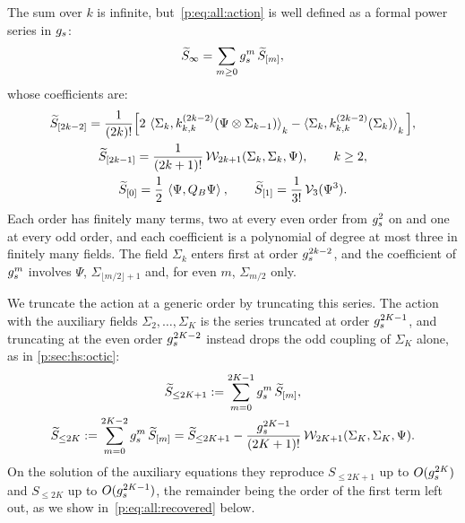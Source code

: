 The sum over $k$ is infinite, but~\eqref{p:eq:all:action} is well defined as a formal power series in $\gs$:
  \begin{equation}
  \caction[\infty]
    = \sum_{m \ge 0} \gs^m \, \widetilde{S}_{[m]},
\end{equation}
  whose coefficients are:
  \begin{equation}
  \label{p:eq:all:orders}
  \begin{gathered}
    \widetilde{S}_{[2 k - 2]}
      = \frac{1}{(2 k)!} \Big[
        2 \, \pair[k]{\Sigma_k}{\kin{k}{}{2 k - 2}(\Psi \otimes \Sigma_{k - 1})}
        - \pair[k]{\Sigma_k}{\kin{k}{}{2 k - 2}(\Sigma_k)}
      \Big],
    \\
    \widetilde{S}_{[2 k - 1]}
      = \frac{1}{(2 k + 1)!} \, \dvertex{2 k + 1}(\Sigma_k, \Sigma_k, \Psi),
    \qquad
    k \ge 2,
    \\
    \widetilde{S}_{[0]}
      = \frac{1}{2} \, \pair{\Psi}{Q_B \Psi},
    \qquad
    \widetilde{S}_{[1]}
      = \frac{1}{3!} \, \vertex{3}(\Psi^3).
  \end{gathered}
\end{equation}
  Each order has finitely many terms, two at every even order from $\gs^2$ on and one at every odd order, and each coefficient is a polynomial of degree at most three in finitely many fields.
  The field $\Sigma_k$ enters first at order $\gs^{2 k - 2}$, and the coefficient of $\gs^m$ involves $\Psi$, $\Sigma_{\lfloor m / 2 \rfloor + 1}$ and, for even $m$, $\Sigma_{m / 2}$ only.

We truncate the action at a generic order by truncating this series.
The action with the auxiliary fields $\Sigma_2, \ldots, \Sigma_K$ is the series truncated at order $\gs^{2 K - 1}$, and truncating at the even order $\gs^{2 K - 2}$ instead drops the odd coupling of $\Sigma_K$ alone, as in \cref{p:sec:hs:octic}:
\begin{equation}
\label{p:eq:all:truncation}
\begin{gathered}
  \caction[\le 2 K + 1]
    := \sum_{m = 0}^{2 K - 1} \gs^m \, \widetilde{S}_{[m]},
  \\
  \caction[\le 2 K]
    := \sum_{m = 0}^{2 K - 2} \gs^m \, \widetilde{S}_{[m]}
    = \caction[\le 2 K + 1] - \frac{\gs^{2 K - 1}}{(2 K + 1)!} \, \dvertex{2 K + 1}(\Sigma_K, \Sigma_K, \Psi).
\end{gathered}
\end{equation}
On the solution of the auxiliary equations they reproduce $S_{\le 2 K + 1}$ up to $O(\gs^{2 K})$ and $S_{\le 2 K}$ up to $O(\gs^{2 K - 1})$, the remainder being the order of the first term left out, as we show in~\eqref{p:eq:all:recovered} below.

